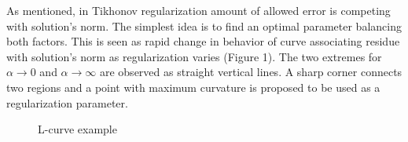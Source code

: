 As mentioned, in Tikhonov regularization amount of allowed error is competing with solution's norm. The simplest idea is to find an optimal parameter balancing both factors. This is seen as rapid change in behavior of curve associating residue with solution's norm as regularization varies (Figure 1). The two extremes for $\alpha \rightarrow 0$ and $\alpha \rightarrow \infty$ are observed as straight vertical lines. A sharp corner connects two regions and a point with maximum curvature is proposed to be used as a regularization parameter. 
\begin{figure}
\caption{L-curve example}
\end{figure}

%

